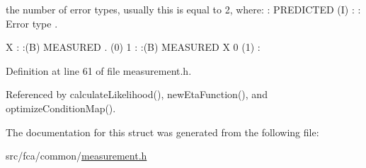 the number of error types, usually this is equal to 2, where\-: \-: \-P\-R\-E\-D\-I\-C\-T\-E\-D (\-I) \-: \-: \-Error type . 

\-X \-: \-:(\-B) \-M\-E\-A\-S\-U\-R\-E\-D . (0) 1 \-: \-:(\-B) \-M\-E\-A\-S\-U\-R\-E\-D \-X 0 (1) \-: 

\-Definition at line 61 of file measurement.\-h.



\-Referenced by calculate\-Likelihood(), new\-Eta\-Function(), and optimize\-Condition\-Map().



\-The documentation for this struct was generated from the following file\-:\begin{DoxyCompactItemize}
\item 
src/fca/common/\hyperlink{common_2measurement_8h}{measurement.\-h}\end{DoxyCompactItemize}
